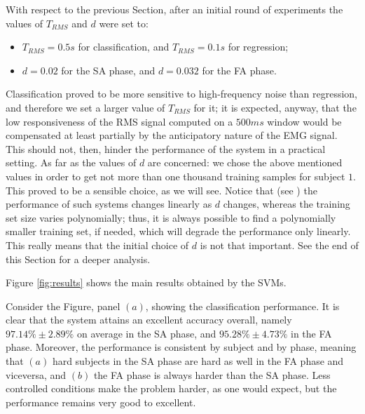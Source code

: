 \documentclass[10pt]{bmc_article}
\newenvironment{bmcformat}{\begin{raggedright}\baselineskip20pt\sloppy\setboolean{publ}{false}}{\end{raggedright}\baselineskip20pt\sloppy}
\begin{document}
\begin{bmcformat}
With respect to the previous Section, after an initial round of
experiments the values of $T_{RMS}$ and $d$ were set to:

\begin{itemize}

  \item $T_{RMS}=0.5s$ for classification, and $T_{RMS}=0.1s$ for regression;

  \item $d=0.02$ for the SA phase, and $d=0.032$ for the FA phase.

\end{itemize}

Classification proved to be more sensitive to high-frequency noise
than regression, and therefore we set a larger value of $T_{RMS}$ for
it; it is expected, anyway, that the low responsiveness of the RMS
signal computed on a $500ms$ window would be compensated at least
partially by the anticipatory nature of the EMG signal. This should
not, then, hinder the performance of the system in a practical
setting. As far as the values of $d$ are concerned: we chose the above
mentioned values in order to get not more than one thousand training
samples for subject $1$.  This proved to be a sensible choice, as we
will see. Notice that (see \cite{2008.BioCyb}) the performance of such
systems changes linearly as $d$ changes, whereas the training set size
varies polynomially; thus, it is always possible to find a
polynomially smaller training set, if needed, which will degrade the
performance only linearly. This really means that the initial choice
of $d$ is not that important. See the end of this Section for a deeper
analysis.

Figure \ref{fig:results} shows the main results obtained by the SVMs.


Consider the Figure, panel $(a)$, showing the classification
performance. It is clear that the system attains an excellent accuracy
overall, namely $97.14\% \pm 2.89\%$ on average in the SA phase, and
$95.28\% \pm 4.73\%$ in the FA phase. Moreover, the performance is
consistent by subject and by phase, meaning that $(a)$ hard subjects
in the SA phase are hard as well in the FA phase and viceversa, and
$(b)$ the FA phase is always harder than the SA phase. Less controlled
conditions make the problem harder, as one would expect, but the
performance remains very good to excellent.


\end{bmcformat}
\end{document}
